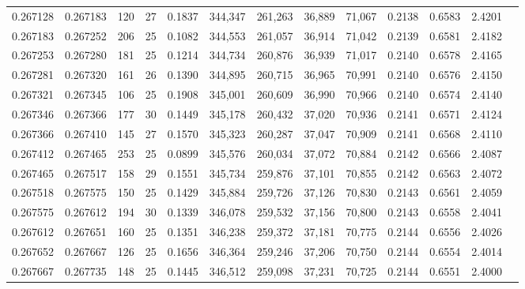 \begin{tabular}{rrrrrrrrrrrrr}
0.267128 & 0.267183 &   120 &  27 &                                     0.1837 & 344,347 & 261,263 &  36,889 &  71,067 & 0.2138 & 0.6583 & 2.4201 \\
0.267183 & 0.267252 &   206 &  25 &                                     0.1082 & 344,553 & 261,057 &  36,914 &  71,042 & 0.2139 & 0.6581 & 2.4182 \\
0.267253 & 0.267280 &   181 &  25 &                                     0.1214 & 344,734 & 260,876 &  36,939 &  71,017 & 0.2140 & 0.6578 & 2.4165 \\
0.267281 & 0.267320 &   161 &  26 &                                     0.1390 & 344,895 & 260,715 &  36,965 &  70,991 & 0.2140 & 0.6576 & 2.4150 \\
0.267321 & 0.267345 &   106 &  25 &                                     0.1908 & 345,001 & 260,609 &  36,990 &  70,966 & 0.2140 & 0.6574 & 2.4140 \\
0.267346 & 0.267366 &   177 &  30 &                                     0.1449 & 345,178 & 260,432 &  37,020 &  70,936 & 0.2141 & 0.6571 & 2.4124 \\
0.267366 & 0.267410 &   145 &  27 &                                     0.1570 & 345,323 & 260,287 &  37,047 &  70,909 & 0.2141 & 0.6568 & 2.4110 \\
0.267412 & 0.267465 &   253 &  25 &                                     0.0899 & 345,576 & 260,034 &  37,072 &  70,884 & 0.2142 & 0.6566 & 2.4087 \\
0.267465 & 0.267517 &   158 &  29 &                                     0.1551 & 345,734 & 259,876 &  37,101 &  70,855 & 0.2142 & 0.6563 & 2.4072 \\
0.267518 & 0.267575 &   150 &  25 &                                     0.1429 & 345,884 & 259,726 &  37,126 &  70,830 & 0.2143 & 0.6561 & 2.4059 \\
0.267575 & 0.267612 &   194 &  30 &                                     0.1339 & 346,078 & 259,532 &  37,156 &  70,800 & 0.2143 & 0.6558 & 2.4041 \\
0.267612 & 0.267651 &   160 &  25 &                                     0.1351 & 346,238 & 259,372 &  37,181 &  70,775 & 0.2144 & 0.6556 & 2.4026 \\
0.267652 & 0.267667 &   126 &  25 &                                     0.1656 & 346,364 & 259,246 &  37,206 &  70,750 & 0.2144 & 0.6554 & 2.4014 \\
0.267667 & 0.267735 &   148 &  25 &                                     0.1445 & 346,512 & 259,098 &  37,231 &  70,725 & 0.2144 & 0.6551 & 2.4000 \\

\end{tabular}
